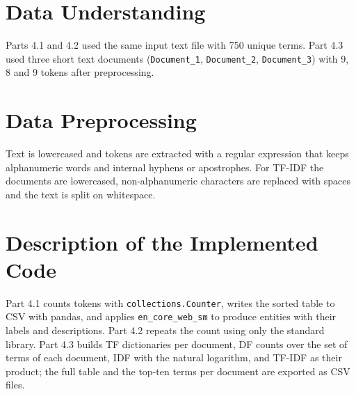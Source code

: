 \documentclass[12pt,a4paper,oneside]{report}
\begin{document}
\section{Data Understanding}
Parts 4.1 and 4.2 used the same input text file with 750 unique terms. Part 4.3 used three short text documents (\texttt{Document\_1}, \texttt{Document\_2}, \texttt{Document\_3}) with 9, 8 and 9 tokens after preprocessing.


\section{Data Preprocessing}
Text is lowercased and tokens are extracted with a regular expression that keeps alphanumeric words and internal hyphens or apostrophes. For TF-IDF the documents are lowercased, non-alphanumeric characters are replaced with spaces and the text is split on whitespace.


\section{Description of the Implemented Code}
Part 4.1 counts tokens with \texttt{collections.Counter}, writes the sorted table to CSV with pandas, and applies \texttt{en\_core\_web\_sm} to produce entities with their labels and descriptions. Part 4.2 repeats the count using only the standard library. Part 4.3 builds TF dictionaries per document, DF counts over the set of terms of each document, IDF with the natural logarithm, and TF-IDF as their product; the full table and the top-ten terms per document are exported as CSV files.
\end{document}
